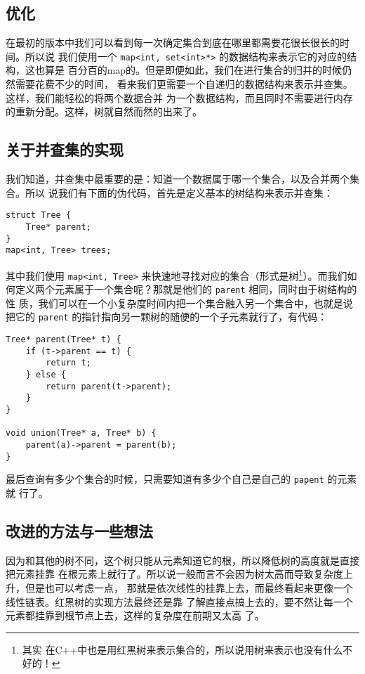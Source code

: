 \subsection{优化}

在最初的版本中我们可以看到每一次确定集合到底在哪里都需要花很长很长的时间。所以说
我们使用一个 \verb|map<int, set<int>*>| 的数据结构来表示它的对应的结构，这也算是
百分百的map的。但是即便如此，我们在进行集合的归并的时候仍然需要花费不少的时间，
看来我们更需要一个自递归的数据结构来表示并查集。这样，我们能轻松的将两个数据合并
为一个数据结构，而且同时不需要进行内存的重新分配。这样，树就自然而然的出来了。

\subsection{关于并查集的实现}

我们知道，并查集中最重要的是：知道一个数据属于哪一个集合，以及合并两个集合。所以
说我们有下面的伪代码，首先是定义基本的树结构来表示并查集：
\begin{lstlisting}
struct Tree {
    Tree* parent;
}
map<int, Tree> trees;
\end{lstlisting}

其中我们使用 \verb|map<int, Tree>| 来快速地寻找对应的集合（形式是树\footnote{其实
在C++中也是用红黑树来表示集合的，所以说用树来表示也没有什么不好的！}）。而我们如
何定义两个元素属于一个集合呢？那就是他们的 \verb|parent| 相同，同时由于树结构的性
质，我们可以在一个小复杂度时间内把一个集合融入另一个集合中，也就是说把它的 
\verb|parent| 的指针指向另一颗树的随便的一个子元素就行了，有代码：
\begin{lstlisting}
Tree* parent(Tree* t) {
    if (t->parent == t) {
        return t;
    } else {
        return parent(t->parent);
    }
}

void union(Tree* a, Tree* b) {
    parent(a)->parent = parent(b);
}
\end{lstlisting}

最后查询有多少个集合的时候，只需要知道有多少个自己是自己的 \verb|papent| 的元素就
行了。

\subsection{改进的方法与一些想法}

因为和其他的树不同，这个树只能从元素知道它的根，所以降低树的高度就是直接把元素挂靠
在根元素上就行了。所以说一般而言不会因为树太高而导致复杂度上升，但是也可以考虑一点，
那就是依次线性的挂靠上去，而最终看起来更像一个线性链表。红黑树的实现方法最终还是靠
了解直接点搞上去的，要不然让每一个元素都挂靠到根节点上去，这样的复杂度在前期又太高
了。

